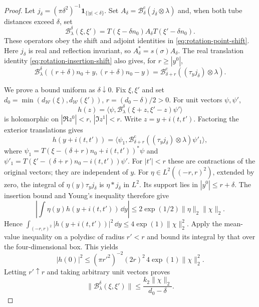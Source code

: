 \begin{proof}
Let $j_\delta=(\pi\delta^2)^{-1}\mathbf1_{\{|y|<\delta\}}$.
Set $A_\delta=\mathcal B_\delta^{\mathrm c}(j_\delta\otimes\lambda)$
and, when both tube distances exceed $\delta$, set
\[
 \mathcal B_\lambda^\delta(\xi,\xi')
   =T(\xi-\delta n_0)A_\delta T(\xi'-\delta n_0).
\]
These operators obey the shift and adjoint identities in
\eqref{eq:rotation-point-shift}. Here $j_\delta$ is real and
reflection invariant, so $A_\delta^*=s(\sigma)A_\delta$.
The real translation identity \eqref{eq:rotation-insertion-shift}
also gives, for $r\ge|y^0|$,
\begin{equation}\label{eq:rotation-point-regularized-translation}
 \mathcal B_\lambda^\delta((r+\delta)n_0+y,(r+\delta)n_0-y)
    =\mathcal B_{\delta+r}^{\mathrm c}((\tau_yj_\delta)\otimes\lambda).
\end{equation}

We prove a bound uniform as $\delta\downarrow0$.
Fix $\xi,\xi'$ and set
$d_0=\min(d_{\mathcal W}(\xi),d_{\mathcal W}(\xi'))$,
$r=(d_0-\delta)/2>0$. For unit vectors $\psi,\psi'$,
\[
 h(z)=\langle\psi,\mathcal B_\lambda^\delta(\xi+z,\xi'-z)\psi'\rangle
\]
is holomorphic on $|\Re z^0|<r$, $|\Im z^1|<r$.
Write $z=y+i(t,t')$. Factoring the exterior translations gives
\[
 h(y+i(t,t'))=
 \langle\psi_1,\mathcal B_{\delta+r}^{\mathrm c}
             ((\tau_yj_\delta)\otimes\lambda)\psi'_1\rangle,
\]
where
$\psi_1=T(\xi-(\delta+r)n_0+i(t,t'))^*\psi$ and
$\psi'_1=T(\xi'-(\delta+r)n_0-i(t,t'))\psi'$.
For $|t'|<r$ these are contractions of the original vectors;
they are independent of $y$.
For $\eta\in L^2((-r,r)^2)$, extended by zero, the integral of
$\eta(y)\tau_yj_\delta$ is $\eta*j_\delta$ in $L^2$.
Its support lies in $|y^0|\le r+\delta$.
The insertion bound and Young's inequality therefore give
\[
 \left|\int\eta(y)h(y+i(t,t'))\,\dd y\right|
   \le2\exp(1/2)\|\eta\|_2\|\chi\|_2.
\]
Hence
$\int_{(-r,r)^2}|h(y+i(t,t'))|^2\,\dd y
\le4\exp(1)\|\chi\|_2^2$.
Apply the mean-value inequality on a polydisc of radius $r'<r$
and bound its integral by that over the four-dimensional box.
This yields
\[
 |h(0)|^2\le(\pi r'^2)^{-2}(2r)^2\,4\exp(1)\|\chi\|_2^2.
\]
Letting $r'\uparrow r$ and taking arbitrary unit vectors proves
\begin{equation}\label{eq:rotation-regularized-point-bound}
 \|\mathcal B_\lambda^\delta(\xi,\xi')\|
       \le\frac{k_2\|\chi\|_2}{d_0-\delta}.
\end{equation}


\end{proof}
